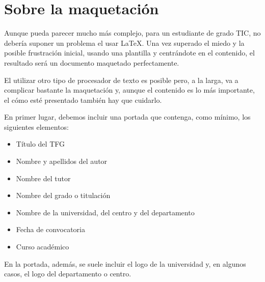 {%


\section{Sobre la maquetación}  %



Aunque pueda parecer mucho más complejo, para un estudiante de grado TIC, no debería suponer un problema el usar \LaTeX. Una vez superado el miedo y la posible frustración inicial, usando una plantilla y centrándote en el contenido, el resultado será un documento maquetado perfectamente.

El utilizar otro tipo de procesador de texto es posible pero, a la larga, va a complicar bastante la maquetación y, aunque el contenido es lo más importante, el cómo esté presentado también hay que cuidarlo.

En primer lugar, debemos incluir una portada que contenga, como mínimo, los siguientes elementos:
\begin{itemize}
    \item Título del TFG
    \item Nombre y apellidos del autor
    \item Nombre del tutor
    \item Nombre del grado o titulación
    \item Nombre de la universidad, del centro y del departamento
    \item Fecha de convocatoria
    \item Curso académico
\end{itemize}

En la portada, además, se suele incluir el logo de la universidad y, en algunos casos, el logo del departamento o centro.

}
